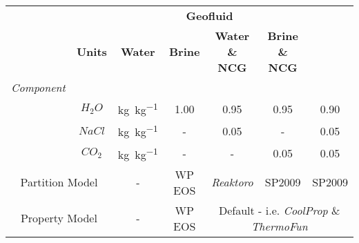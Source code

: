 \begin{tabular}{|p{4.5em} c | c | c | c | c| c |}
    \hline
    \rowcolor{bluepoli!40}
    \multicolumn{2}{|c|}{} &  & \multicolumn{4}{c|}{\textbf{Geofluid}} \T\B \\
    \rowcolor{bluepoli!40}
    \multicolumn{2}{|c|}{} & \textbf{Units} & \textbf{Water} & \textbf{Brine} & \textbf{Water \& NCG} & \textbf{Brine \& NCG} \T\B \\
    \hline \hline
    \emph{Component} &   &   &  &  &  &  \T\B\\
     & \(H_2O\) & \unit{\kg \per \kg} & 1.00 & 0.95 & 0.95 & 0.90 \T\B\\
    & \(NaCl\) & \unit{\kg \per \kg} & - & 0.05 & - & 0.05 \T\B\\
    & \(CO_2\) & \unit{\kg \per \kg} & - & - & 0.05 & 0.05 \T\B\\
    \hline
    \multicolumn{2}{|c|}{Partition Model} & - & \ac{WP} \ac{EOS} & \emph{Reaktoro} & \ac{SP2009} & \ac{SP2009} \T\B\\
    \hline
    \multicolumn{2}{|c|}{Property Model} & - & \ac{WP} \ac{EOS} & \multicolumn{3}{|c|}{Default - i.e. \emph{CoolProp} \& \emph{ThermoFun}} \T\B\\

     \hline
\end{tabular}